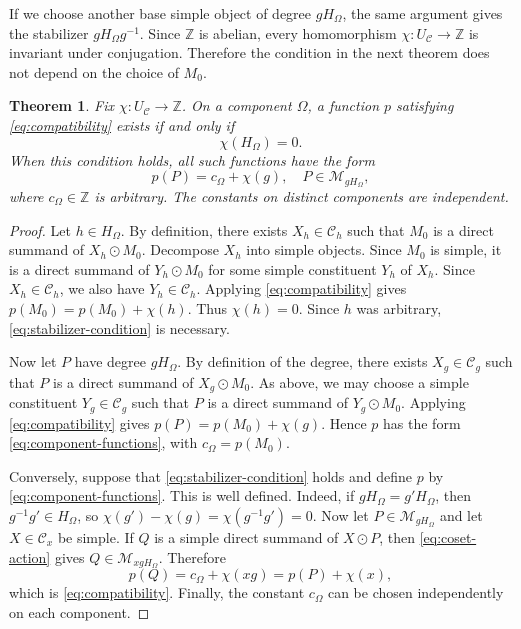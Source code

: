 \documentclass[11pt]{amsart}
\newcommand{\C}{\mathcal C}
\newcommand{\M}{\mathcal M}
\newtheorem{theorem}{Theorem}[section]
\theoremstyle{definition}
\theoremstyle{remark}
\theoremstyle{plain}
\begin{document}
If we choose another base simple object of degree $gH_\Omega$, the same argument gives the stabilizer $gH_\Omega g^{-1}$. Since $\mathbb Z$ is abelian, every homomorphism $\chi: U_{\C}\to\mathbb Z$ is invariant under conjugation. Therefore the condition in the next theorem does not depend on the choice of $M_0$.

\begin{theorem}\label{thm:stabilizer}
Fix $\chi: U_{\C}\to\mathbb Z$. On a component $\Omega$, a function $p$ satisfying \eqref{eq:compatibility} exists if and only if
\begin{equation}\label{eq:stabilizer-condition}
\chi(H_\Omega)=0.
\end{equation}
When this condition holds, all such functions have the form
\begin{equation}\label{eq:component-functions}
p(P)=c_\Omega+\chi(g),\quad P\in\M_{gH_\Omega},
\end{equation}
where $c_\Omega\in\mathbb Z$ is arbitrary. The constants on distinct components are independent.
\end{theorem}

\begin{proof}
Let $h\in H_\Omega$. By definition, there exists $X_h\in\C_h$ such that $M_0$ is a direct summand of $X_h\odot M_0$. Decompose $X_h$ into simple objects. Since $M_0$ is simple, it is a direct summand of $Y_h\odot M_0$ for some simple constituent $Y_h$ of $X_h$. Since $X_h\in\C_h$, we also have $Y_h\in\C_h$. Applying \eqref{eq:compatibility} gives $p(M_0)=p(M_0)+\chi(h)$. Thus $\chi(h)=0$. Since $h$ was arbitrary, \eqref{eq:stabilizer-condition} is necessary.

Now let $P$ have degree $gH_\Omega$. By definition of the degree, there exists $X_g\in\C_g$ such that $P$ is a direct summand of $X_g\odot M_0$. As above, we may choose a simple constituent $Y_g\in\C_g$ such that $P$ is a direct summand of $Y_g\odot M_0$. Applying \eqref{eq:compatibility} gives $p(P)=p(M_0)+\chi(g)$. Hence $p$ has the form \eqref{eq:component-functions}, with $c_\Omega=p(M_0)$.

Conversely, suppose that \eqref{eq:stabilizer-condition} holds and define $p$ by \eqref{eq:component-functions}. This is well defined. Indeed, if $gH_\Omega=g'H_\Omega$, then $g^{-1}g'\in H_\Omega$, so $\chi(g')-\chi(g)=\chi(g^{-1}g')=0$. Now let $P\in\M_{gH_\Omega}$ and let $X\in\C_x$ be simple. If $Q$ is a simple direct summand of $X\odot P$, then \eqref{eq:coset-action} gives $Q\in\M_{xgH_\Omega}$. Therefore
\[
p(Q)=c_\Omega+\chi(xg)=p(P)+\chi(x),
\]
which is \eqref{eq:compatibility}. Finally, the constant $c_\Omega$ can be chosen independently on each component.
\end{proof}
\end{document}
